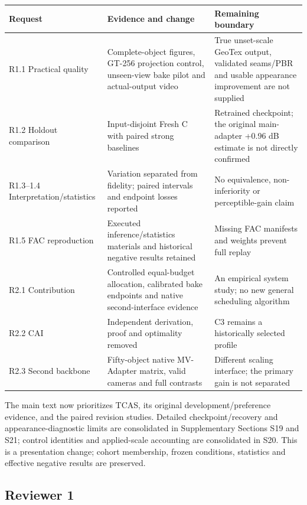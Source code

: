 \documentclass[
  10pt,
]{article}
\begin{document}
\begin{longtable}[]{@{}
  >{\raggedright\arraybackslash}p{}
  >{\raggedright\arraybackslash}p{}
  >{\raggedright\arraybackslash}p{}@{}}
\toprule
Request & Evidence and change & Remaining boundary \\
\midrule
\endhead
R1.1 Practical quality & Complete-object figures, GT-256 projection
control, unseen-view bake pilot and actual-output video & True
unset-scale GeoTex output, validated seams/PBR and usable appearance
improvement are not supplied \\
R1.2 Holdout comparison & Input-disjoint Fresh C with paired strong
baselines & Retrained checkpoint; the original main-adapter +0.96 dB
estimate is not directly confirmed \\
R1.3--1.4 Interpretation/statistics & Variation separated from fidelity;
paired intervals and endpoint losses reported & No equivalence,
non-inferiority or perceptible-gain claim \\
R1.5 FAC reproduction & Executed inference/statistics materials and
historical negative results retained & Missing FAC manifests and weights
prevent full replay \\
R2.1 Contribution & Controlled equal-budget allocation, calibrated bake
endpoints and native second-interface evidence & An empirical system
study; no new general scheduling algorithm \\
R2.2 CAI & Independent derivation, proof and optimality removed & C3
remains a historically selected profile \\
R2.3 Second backbone & Fifty-object native MV-Adapter matrix, valid
cameras and full contrasts & Different scaling interface; the primary
gain is not separated \\
\bottomrule
\end{longtable}

The main text now prioritizes TCAS, its original development/preference
evidence, and the paired revision studies. Detailed checkpoint/recovery
and appearance-diagnostic limits are consolidated in Supplementary
Sections S19 and S21; control identities and applied-scale accounting
are consolidated in S20. This is a presentation change; cohort
membership, frozen conditions, statistics and effective negative results
are preserved.

\hypertarget{reviewer-1}{%
\subsection{Reviewer 1}\label{reviewer-1}}
\end{document}
